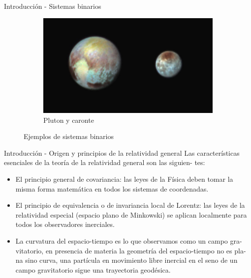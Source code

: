 \begin{frame}{Introducción - Sistemas binarios}
\begin{minipage}{0.20\linewidth}
\begin{figure}[H]
            \begin{subfigure}{1\linewidth}
                \centering
                \includegraphics[scale=0.07]{images/caronte.jpg}
                \caption{Pluton y caronte}
            \end{subfigure}
            \caption{Ejemplos de sistemas binarios}
        \end{figure}
    \end{minipage}
    \end{frame}
\begin{frame}{Introducción - Origen y principios de la relatividad general}
    Las características esenciales de la teoría de la relatividad general son las siguien-
tes:
\begin{itemize}
\item El principio general de covariancia: las leyes de la Física deben tomar la
misma forma matemática en todos los sistemas de coordenadas.
\item El principio de equivalencia o de invariancia local de Lorentz: las leyes de
la relatividad especial (espacio plano de Minkowski) se aplican localmente
para todos los observadores inerciales.
\item La curvatura del espacio-tiempo es lo que observamos como un campo gra-
vitatorio, en presencia de materia la geometría del espacio-tiempo no es pla-
na sino curva, una partícula en movimiento libre inercial en el seno de un
campo gravitatorio sigue una trayectoria geodésica.
\end{itemize}
\end{frame}